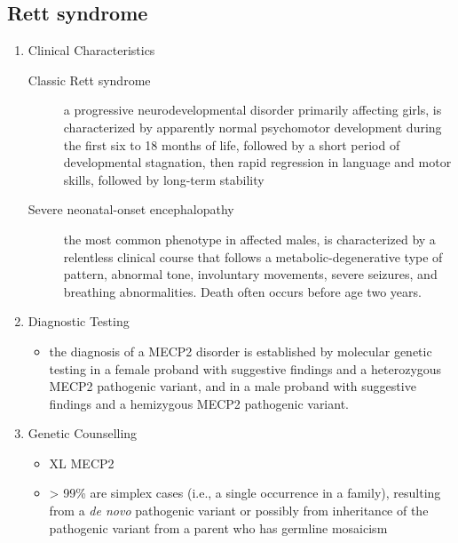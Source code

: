 \documentclass[12pt]{scrartcl}
\begin{document}
\subsection{Rett syndrome}
\label{sec:orgd994dbd}
\begin{enumerate}
\item Clinical Characteristics
\label{sec:org4d960fc}
\begin{description}
\item[{\female Classic Rett syndrome}] a progressive neurodevelopmental
disorder primarily affecting girls, is characterized by apparently
normal psychomotor development during the first six to 18 months of
life, followed by a short period of developmental stagnation, then
rapid regression in language and motor skills, followed by long-term
stability
\item[{\male Severe neonatal-onset encephalopathy}] the most common
phenotype in affected males, is characterized by a relentless
clinical course that follows a metabolic-degenerative type of
pattern, abnormal tone, involuntary movements, severe seizures, and
breathing abnormalities. Death often occurs before age two years.
\end{description}
\item Diagnostic Testing
\label{sec:org8b3603e}
\begin{itemize}
\item the diagnosis of a MECP2 disorder is established by molecular
genetic testing in a female proband with suggestive findings and a
heterozygous MECP2 pathogenic variant, and in a male proband with
suggestive findings and a hemizygous MECP2 pathogenic variant.
\end{itemize}
\item Genetic Counselling
\label{sec:org2c8d3a5}
\begin{itemize}
\item XL MECP2
\item \textgreater{} 99\% are simplex cases (i.e., a single occurrence in a family),
resulting from a \emph{de novo} pathogenic variant or possibly from
inheritance of the pathogenic variant from a parent who has germline
mosaicism
\end{itemize}
\end{enumerate}
\end{document}
